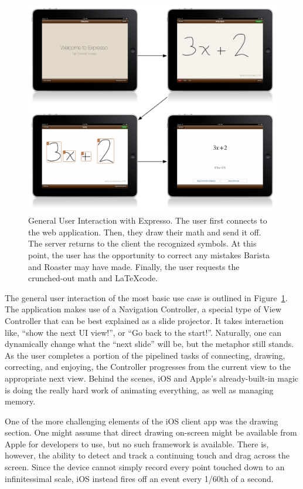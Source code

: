 \documentclass{acm_proc_article-sp}
\begin{document}
\begin{figure}
\centering
\includegraphics[width=1.0\textwidth]{user_workflow.pdf}
\caption{General User Interaction with Expresso. The user first connects to the web application. Then, they draw their math and send it off. The server returns to the client the recognized symbols. At this point, the user has the opportunity to correct any mistakes Barista and Roaster may have made. Finally, the user requests the crunched-out math and \LaTeX code.}
\label{fig:user_workflow}
\end{figure}

The general user interaction of the most basic use case is outlined in Figure~\ref{fig:user_workflow}. The application makes use of a Navigation Controller, a special type of View Controller that can be best explained as a slide projector. It takes interaction like, ``show the next UI view!'', or ``Go back to the start!''. Naturally, one can dynamically change what the ``next slide'' will be, but the metaphor still stands. As the user completes a portion of the pipelined tasks of connecting, drawing, correcting, and enjoying, the Controller progresses from the current view to the appropriate next view. Behind the scenes, iOS and Apple's already-built-in magic is doing the really hard work of animating everything, as well as managing memory.

One of the more challenging elements of the iOS client app was the drawing section. One might assume that direct drawing on-screen might be available from Apple for developers to use, but no such framework is available. There is, however, the ability to detect and track a continuing touch and drag across the screen. Since the device cannot simply record every point touched down to an infinitessimal scale, iOS instead fires off an event every 1/60th of a second. 
\end{document}
